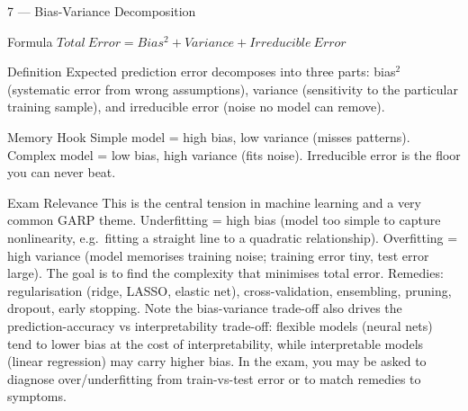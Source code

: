 \documentclass[aspectratio=169,8pt]{beamer}
\begin{document}
	\begin{frame}{7 --- Bias-Variance Decomposition}
		\begin{block}{Formula}
			$Total\ Error = Bias^2 + Variance + Irreducible\ Error$
		\end{block}
		\begin{block}{Definition}
			Expected prediction error decomposes into three parts: bias$^2$ (systematic error from wrong assumptions), variance (sensitivity to the particular training sample), and irreducible error (noise no model can remove).
		\end{block}
		\begin{block}{Memory Hook}
			Simple model = high bias, low variance (misses patterns). Complex model = low bias, high variance (fits noise). Irreducible error is the floor you can never beat.
		\end{block}
		\begin{block}{Exam Relevance}
			This is the central tension in machine learning and a very common GARP theme. Underfitting = high bias (model too simple to capture nonlinearity, e.g.\ fitting a straight line to a quadratic relationship). Overfitting = high variance (model memorises training noise; training error tiny, test error large). The goal is to find the complexity that minimises total error. Remedies: regularisation (ridge, LASSO, elastic net), cross-validation, ensembling, pruning, dropout, early stopping. Note the bias-variance trade-off also drives the prediction-accuracy vs interpretability trade-off: flexible models (neural nets) tend to lower bias at the cost of interpretability, while interpretable models (linear regression) may carry higher bias. In the exam, you may be asked to diagnose over/underfitting from train-vs-test error or to match remedies to symptoms.
		\end{block}
	\end{frame}
	
\end{document}
